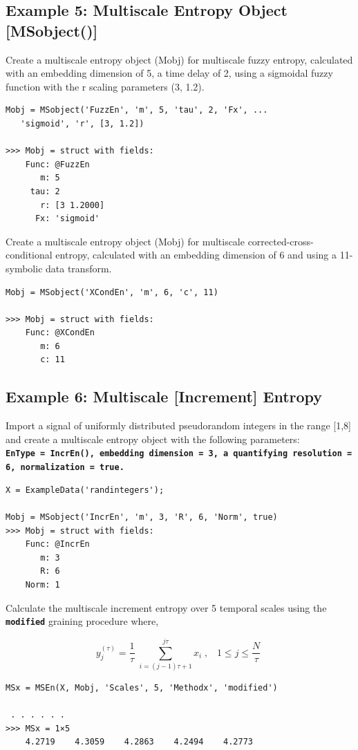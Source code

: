 \documentclass[12pt, a4paper, titlepage, openany]{book}
\begin{document}
\newpage
\subsection{\normalsize Example 5: \hspace{15mm} Multiscale Entropy Object [MSobject()]}
\noindent Create a multiscale entropy object (Mobj) for multiscale fuzzy entropy, calculated with an embedding dimension of 5, a time delay of 2, using a sigmoidal fuzzy function with the r scaling parameters (3, 1.2).
\begin{verbatim}
Mobj = MSobject('FuzzEn', 'm', 5, 'tau', 2, 'Fx', ...
   'sigmoid', 'r', [3, 1.2])

>>> Mobj = struct with fields:
    Func: @FuzzEn
       m: 5
     tau: 2
       r: [3 1.2000]
      Fx: 'sigmoid'
\end{verbatim}
Create a multiscale entropy object (Mobj) for multiscale corrected-cross-conditional entropy, calculated with an embedding dimension of 6 and using a 11-symbolic data transform.
\begin{verbatim}
Mobj = MSobject('XCondEn', 'm', 6, 'c', 11)

>>> Mobj = struct with fields:
    Func: @XCondEn
       m: 6
       c: 11
\end{verbatim}


\newpage
\subsection{\normalsize Example 6: \hspace{15mm} Multiscale [Increment] Entropy}
\noindent Import a signal of uniformly distributed pseudorandom integers in the range [1,8] and create a multiscale entropy object with the following parameters:\\
\textbf{\texttt{EnType =  IncrEn(), embedding dimension = 3, a quantifying resolution = 6, normalization = true.}}
\begin{verbatim}
X = ExampleData('randintegers');

Mobj = MSobject('IncrEn', 'm', 3, 'R', 6, 'Norm', true)
>>> Mobj = struct with fields:
    Func: @IncrEn
       m: 3
       R: 6
    Norm: 1
\end{verbatim}    
Calculate the multiscale increment entropy over 5 temporal scales using the \texttt{\textbf{modified}} graining procedure where,
\begin{par}
$$y_j^{\left(\tau \right)} =\frac{1}{\tau }\;\sum_{i=\left(j-1\right)\tau +1}^{j\tau } x_i \;,\;\;\;1\le j\le \frac{N}{\tau }\;$$
\end{par}
\begin{verbatim}
MSx = MSEn(X, Mobj, 'Scales', 5, 'Methodx', 'modified')

 . . . . . .
>>> MSx = 1×5
    4.2719    4.3059    4.2863    4.2494    4.2773
\end{verbatim}
\end{document}

